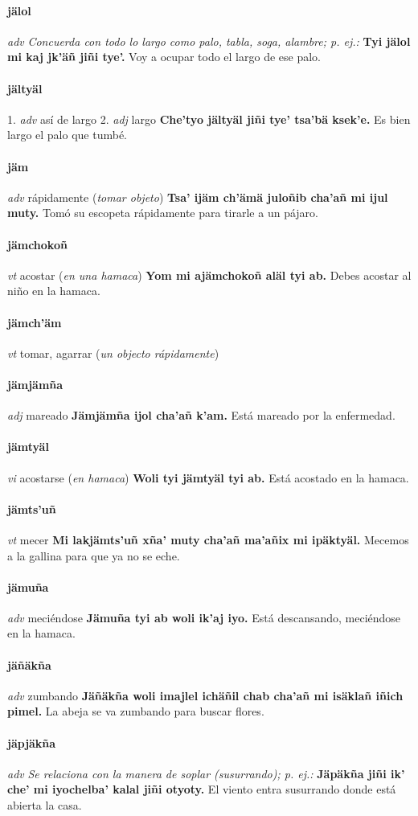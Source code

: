 \documentclass{scrbook}
\newcommand{\entry}[1]{\paragraph{#1}}
\newcommand{\onedefinition}[1]{#1.}
\newcommand{\nontranslationdef}[1]{\textit{#1}}
\newcommand{\partofspeech}[1]{\textit{#1}}
\newcommand{\spanishtranslation}[1]{#1}
\newcommand{\clarification}[1]{(\textit{#1})}
\newcommand{\cholexample}[1]{\textbf{#1}}
\newcommand{\exampletranslation}[1]{#1}
\begin{document}
\begin{multicols}{2}
\entry{jälol}
\partofspeech{adv}
\nontranslationdef{Concuerda con todo lo largo como palo, tabla, soga, alambre; p. ej.:}
\cholexample{Tyi jälol mi kaj jk'äñ jiñi tye'.}
\exampletranslation{Voy a ocupar todo el largo de ese palo.}

\entry{jältyäl}
\onedefinition{1}
\partofspeech{adv}
\spanishtranslation{así de largo}
\onedefinition{2}
\partofspeech{adj}
\spanishtranslation{largo}
\cholexample{Che'tyo jältyäl jiñi tye' tsa'bä ksek'e.}
\exampletranslation{Es bien largo el palo que tumbé.}

\entry{jäm}
\partofspeech{adv}
\spanishtranslation{rápidamente}
\clarification{tomar objeto}
\cholexample{Tsa' ijäm ch'ämä juloñib cha'añ mi ijul muty.}
\exampletranslation{Tomó su escopeta rápidamente para tirarle a un pájaro.}

\entry{jämchokoñ}
\partofspeech{vt}
\spanishtranslation{acostar}
\clarification{en una hamaca}
\cholexample{Yom mi ajämchokoñ aläl tyi ab.}
\exampletranslation{Debes acostar al niño en la hamaca.}

\entry{jämch'äm}
\partofspeech{vt}
\spanishtranslation{tomar, agarrar}
\clarification{un objecto rápidamente}

\entry{jämjämña}
\partofspeech{adj}
\spanishtranslation{mareado}
\cholexample{Jämjämña ijol cha'añ k'am.}
\exampletranslation{Está mareado por la enfermedad.}

\entry{jämtyäl}
\partofspeech{vi}
\spanishtranslation{acostarse}
\clarification{en hamaca}
\cholexample{Woli tyi jämtyäl tyi ab.}
\exampletranslation{Está acostado en la hamaca.}

\entry{jämts'uñ}
\partofspeech{vt}
\spanishtranslation{mecer}
\cholexample{Mi lakjämts'uñ xña' muty cha'añ ma'añix mi ipäktyäl.}
\exampletranslation{Mecemos a la gallina para que ya no se eche.}

\entry{jämuña}
\partofspeech{adv}
\spanishtranslation{meciéndose}
\cholexample{Jämuña tyi ab woli ik'aj iyo.}
\exampletranslation{Está descansando, meciéndose en la hamaca.}

\entry{jäñäkña}
\partofspeech{adv}
\spanishtranslation{zumbando}
\cholexample{Jäñäkña woli imajlel ichäñil chab cha'añ mi isäklañ iñich pimel.}
\exampletranslation{La abeja se va zumbando para buscar flores.}

\entry{jäpjäkña}
\partofspeech{adv}
\nontranslationdef{Se relaciona con la manera de soplar (susurrando); p. ej.:}
\cholexample{Jäpäkña jiñi ik' che' mi iyochelba' kalal jiñi otyoty.}
\exampletranslation{El viento entra susurrando donde está abierta la casa.}


\end{multicols}
\end{document}
